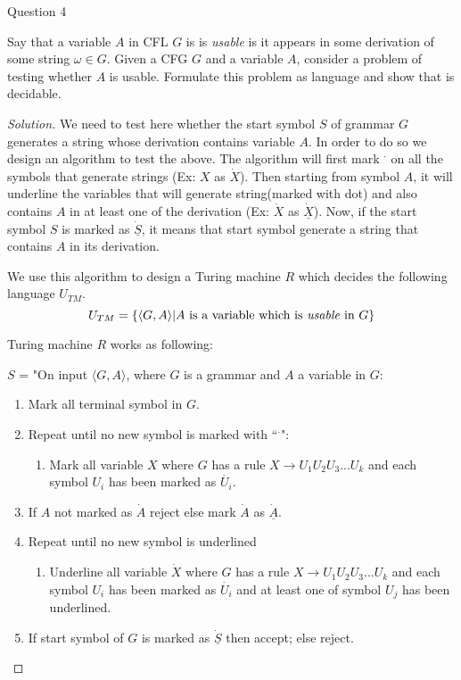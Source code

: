 \begin{solution}{Question 4}\label{ques:4}
    \begin{question}
        Say that a variable $A$ in CFL $G$ is is \emph{usable} is it appears in some derivation of some string $\omega \in G$. Given a CFG $G$ and a variable $A$, consider a problem of testing whether $A$ is usable. Formulate this problem as language and show that is decidable.
    \end{question}
    \tcblower{}
    \begin{proof}[Solution]
        We need to test here whether the start symbol $S$ of grammar $G$ generates a string whose derivation contains variable $A$. In order to do so we design an algorithm to test the above. The algorithm will first mark $^\cdot$ on all the symbols that generate strings (Ex: $X$ as $\dot{X}$). Then starting from symbol $A$, it will underline the variables that will generate string(marked with dot) and also contains $A$ in at least one of the derivation (Ex: $\dot{X}$ as $\underline{\dot{X}}$). Now, if the start symbol $S$ is marked as $\underline{\dot{S}}$, it means that start symbol generate a string that contains $A$ in its derivation.
        
        \bigskip
        
        We use this algorithm to design a Turing machine $R$ which decides the following language $U_{TM}$.
        \[U_{TM} = \{\langle G, A\rangle | A \text{ is a variable which is \emph{usable} in } G \}\]
        
        Turing machine $R$ works as following:
        
        \bigskip
        
        $S$ = "On input $\langle G, A\rangle$, where $G$ is a grammar and $A$ a variable in $G$:
        \begin{enumerate}
            \item Mark all terminal symbol in $G$.
            \item Repeat until no new symbol is marked with ``$^\cdot$":
            \begin{enumerate}
                \item Mark all variable $X$ where $G$ has a rule $X \longrightarrow U_1U_2U_3...U_k$ and each symbol $U_i$ has been marked as $\dot{U_i}$.
            \end{enumerate}
            \item If $A$ not marked as $\dot{A}$ reject else mark $\dot{A}$ as $\underline{\dot{A}}$.
            \item Repeat until no new symbol is underlined
            \begin{enumerate}
                \item Underline all variable $\dot{X}$ where $G$ has a rule  $X \longrightarrow U_1U_2U_3...U_k$ and each symbol $U_i$ has been marked as $\dot{U_i}$ and at least one of symbol $U_j$ has been underlined.
            \end{enumerate}
            \item If start symbol of $G$ is marked as $\underline{\dot{S}}$ then accept; else reject.
        \end{enumerate}
        

\end{proof}
\end{solution}

